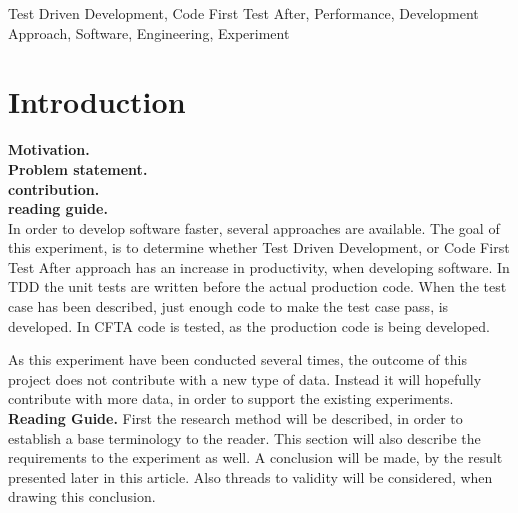 \documentclass{sig-alternate-05-2015}
\begin{document}


%
%

%
%
\printccsdesc

\begin{keywords}
Test Driven Development, Code First Test After, Performance, Development Approach, Software, Engineering, \newline Experiment
\end{keywords}


\section{Introduction}

\textbf{Motivation.}\\
\textbf{Problem statement.}\\
\textbf{contribution.}\\
\textbf{reading guide.}\\

In order to develop software faster, several approaches are available. The goal of this experiment, is to determine whether Test Driven Development, or Code First Test After approach has an increase in productivity, when developing software. In TDD the unit tests are written before the actual production code. When the test case has been described, just enough code to make the test case pass, is developed.
In CFTA code is tested, as the production code is being developed.

As this experiment have been conducted several times, the outcome of this project does not contribute with a new type of data. Instead it will hopefully contribute with more data, in order to support the existing experiments.\\
[0.5em]
\textbf{Reading Guide.}
First the research method will be described, in order to establish a base terminology to the reader. This section will also describe the requirements to the experiment as well.
A conclusion will be made, by the result presented later in this article. Also threads to validity will be considered, when drawing this conclusion.
\end{document}
